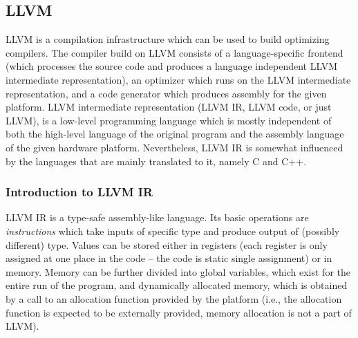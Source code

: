 \subsection{LLVM} %

LLVM is a compilation infrastructure which can be used to build optimizing
compilers.
The compiler build on LLVM consists of a language-specific frontend (which
processes the source code and produces a language independent LLVM intermediate
representation), an optimizer which runs on the LLVM intermediate
representation, and a code generator which produces assembly for the given
platform.
LLVM intermediate representation (LLVM IR, LLVM code, or just LLVM), is a
low-level programming language which is mostly independent of both the
high-level language of the original program and the assembly language of the
given hardware platform.
Nevertheless, LLVM IR is somewhat influenced by the languages that are mainly
translated to it, namely C and C++.

\subsubsection{Introduction to LLVM IR}

LLVM IR is a type-safe assembly-like language.
Its basic operations are \emph{instructions} which take inputs of specific type
and produce output of (possibly different) type.
Values can be stored either in registers (each register is only assigned at one
place in the code -- the code is static single assignment) or in memory.
Memory can be further divided into global variables, which exist for the entire
run of the program, and dynamically allocated memory, which is obtained by a
call to an allocation function provided by the platform (i.e., the allocation
function is expected to be externally provided, memory allocation is not a part
of LLVM).

